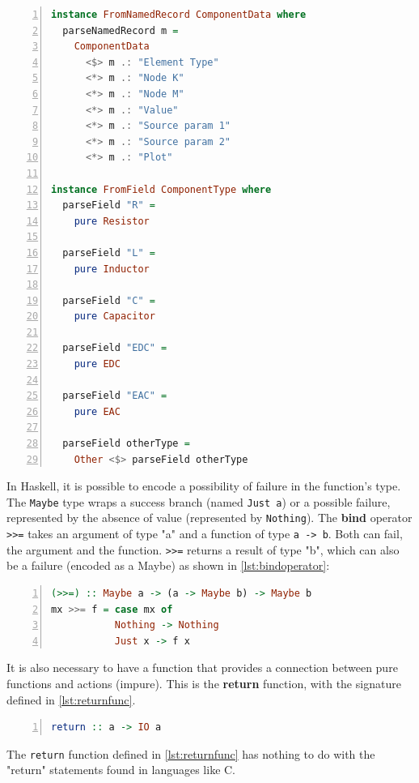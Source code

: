 \begin{lstlisting}[language=Haskell, numbers=left, caption={Using Applicatives}, captionpos=b, label={lst:usingapplicatives}]
instance FromNamedRecord ComponentData where
  parseNamedRecord m =
    ComponentData
      <$> m .: "Element Type"
      <*> m .: "Node K"
      <*> m .: "Node M"
      <*> m .: "Value"
      <*> m .: "Source param 1"
      <*> m .: "Source param 2"
      <*> m .: "Plot"

instance FromField ComponentType where
  parseField "R" =
    pure Resistor

  parseField "L" =
    pure Inductor

  parseField "C" =
    pure Capacitor

  parseField "EDC" =
    pure EDC

  parseField "EAC" =
    pure EAC

  parseField otherType =
    Other <$> parseField otherType
\end{lstlisting}


In Haskell, it is possible to encode a possibility of failure in the function's type. The \lstinline!Maybe! type wraps a success branch (named \lstinline!Just a!) or a possible failure, represented by the absence of value (represented by \lstinline!Nothing!). The \textbf{bind} operator \lstinline!>>=! takes an argument of type "a"  and a function of type \lstinline!a -> b!. Both can fail, the argument and the function. \lstinline!>>=! returns a result of type "b", which can also be a failure (encoded as a Maybe) as shown in \cref{lst:bindoperator}:


\begin{lstlisting}[language=Haskell, numbers=left, caption={The bind operator}, captionpos=b, label={lst:bindoperator}]
(>>=) :: Maybe a -> (a -> Maybe b) -> Maybe b
mx >>= f = case mx of
           Nothing -> Nothing
           Just x -> f x
\end{lstlisting}

It is also necessary to have a function that provides a connection between pure functions and actions (impure). This is the \textbf{return} function, with the signature defined in \cref{lst:returnfunc}.

\begin{lstlisting}[language=Haskell, numbers=left, caption={The return}, captionpos=b, label={lst:returnfunc}]
return :: a -> IO a
\end{lstlisting}

The \lstinline!return! function defined in \cref{lst:returnfunc} has nothing to do with the "return" statements found in languages like C.


